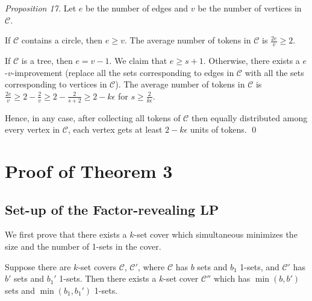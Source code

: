 \documentclass[runningheads,a4paper]{llncs}
\numberwithin{equation}{section}
\begin{document}
\begin{proof}[Proposition 17]
Let $e$ be the number of edges and $v$ be the number of vertices in $\mathscr{C}$.

If $\mathscr{C}$ contains a circle, then $e\geq v$. The average number of tokens in $\mathscr{C}$ is $\frac{2e}{v}\geq 2$.

If $\mathscr{C}$ is a tree, then $e=v-1$. We claim that $e\geq s+1$. Otherwise, there exists a $e$-$v$-improvement (replace all the sets corresponding to edges in $\mathscr{C}$ with all the sets corresponding to vertices in $\mathscr{C}$). The average number of tokens in $\mathscr{C}$ is $\frac{2e}{v}\geq 2-\frac{2}{v}\geq 2-\frac{2}{s+2}\geq 2-k\epsilon$ for $s\geq \frac{2}{k\epsilon}$.

Hence, in any case, after collecting all tokens of $\mathscr{C}$ then equally distributed among every vertex in $\mathscr{C}$, each vertex gets at least $2-k\epsilon$ units of tokens.  \qed
\end{proof}


\section{Proof of Theorem 3}

\subsection{Set-up of the Factor-revealing LP}

We first prove that there exists a $k$-set cover which simultaneous minimizes the size and the number of 1-sets in the cover.
\begin{lemma}
Suppose there are $k$-set covers $\mathscr{C}$, $\mathscr{C}'$, where $\mathscr{C}$ has $b$ sets and $b_1$ 1-sets, and $\mathscr{C}'$ has $b'$ sets and $b_1'$ 1-sets. Then there exists a $k$-set cover $\mathscr{C}''$ which has $\min(b, b')$ sets and $\min(b_1,b_1')$ 1-sets.
\end{lemma}
\end{document}
